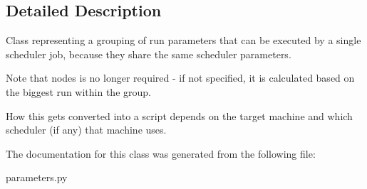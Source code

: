 \subsection{Detailed Description}
\begin{DoxyVerb}Class representing a grouping of run parameters that can be executed by
a single scheduler job, because they share the same scheduler parameters.

Note that nodes is no longer required - if not specified, it is calculated
based on the biggest run within the group.

How this gets converted into a script depends on the target machine and
which scheduler (if any) that machine uses.
\end{DoxyVerb}
 

The documentation for this class was generated from the following file\+:\begin{DoxyCompactItemize}
\item 
parameters.\+py\end{DoxyCompactItemize}

